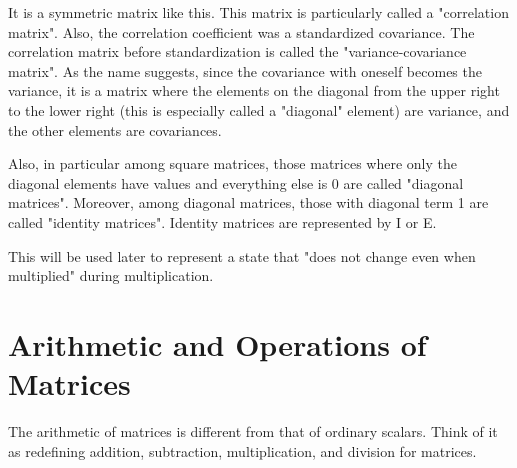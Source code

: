 \documentclass{ltjsbook}
\begin{document}


It is a symmetric matrix like this. This matrix is particularly called a "correlation matrix". Also, the correlation coefficient was a standardized covariance. The correlation matrix before standardization is called the "variance-covariance matrix". As the name suggests, since the covariance with oneself becomes the variance, it is a matrix where the elements on the diagonal from the upper right to the lower right (this is especially called a "diagonal" element) are variance, and the other elements are covariances.



Also, in particular among square matrices, those matrices where only the diagonal elements have values and everything else is 0 are called "diagonal matrices". Moreover, among diagonal matrices, those with diagonal term 1 are called "identity matrices". Identity matrices are represented by Ι or E.





This will be used later to represent a state that "does not change even when multiplied" during multiplication.



\section{Arithmetic and Operations of Matrices}
The arithmetic of matrices is different from that of ordinary scalars. Think of it as redefining addition, subtraction, multiplication, and division for matrices.
\end{document}
